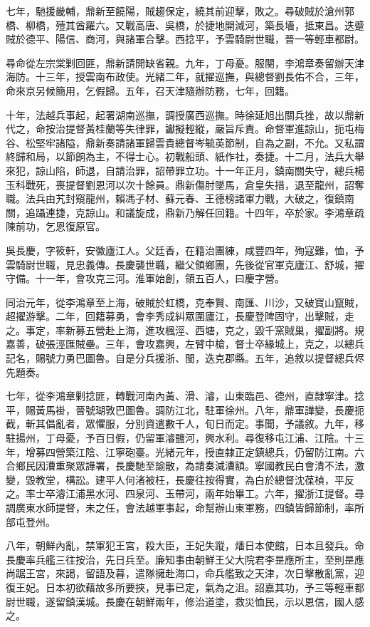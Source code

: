 \begin{pinyinscope}
七年，馳援畿輔，鼎新至饒陽，賊趨保定，繞其前迎擊，敗之。尋破賊於滄州郭橋、柳橋，殪其酋羅六。又戰高唐、吳橋，於捷地開減河，築長墻，抵東昌。迭蹙賊於德平、陽信、商河，與諸軍合擊。西捻平，予雲騎尉世職，晉一等輕車都尉。

尋命從左宗棠剿回匪，鼎新請開缺省親。九年，丁母憂。服闋，李鴻章奏留辦天津海防。十三年，授雲南布政使。光緒二年，就擢巡撫，與總督劉長佑不合，三年，命來京另候簡用，乞假歸。五年，召天津隨辦防務，七年，回籍。

十年，法越兵事起，起署湖南巡撫，調授廣西巡撫。時徐延旭出關兵挫，故以鼎新代之，命按治提督黃桂蘭等失律罪，讞擬輕縱，嚴旨斥責。命督軍進諒山，扼屯梅谷、松堅牢諸隘，鼎新奏請諸軍歸雲貴總督岑毓英節制，自為之副，不允。又私謂終歸和局，以節餉為主，不得士心。初戰船頭、紙作社，奏捷。十二月，法兵大舉來犯，諒山陷，師退，自請治罪，詔帶罪立功。十一年正月，鎮南關失守，總兵楊玉科戰死，喪提督劉恩河以次十餘員。鼎新傷肘墜馬，倉皇失措，退至龍州，詔奪職。法兵由艽封窺龍州，賴馮子材、蘇元春、王德榜諸軍力戰，大破之，復鎮南關，追躡連捷，克諒山。和議旋成，鼎新乃解任回籍。十四年，卒於家。李鴻章疏陳前功，乞恩復原官。

吳長慶，字筱軒，安徽廬江人。父廷香，在籍治團練，咸豐四年，殉寇難，恤，予雲騎尉世職，見忠義傳。長慶襲世職，繼父領鄉團，先後從官軍克廬江、舒城，擢守備。十一年，會攻克三河。淮軍始創，領五百人，曰慶字營。

同治元年，從李鴻章至上海，破賊於虹橋，克奉賢、南匯、川沙，又破寶山竄賊，超擢游擊。二年，回籍募勇，會李秀成糾眾圍廬江，長慶登陴固守，出擊賊，走之。事定，率新募五營赴上海，進攻楓涇、西塘，克之，毀千窯賊巢，擢副將。規嘉善，破張涇匯賊壘。三年，會攻嘉興，左臂中槍，督士卒緣城上，克之，以總兵記名，賜號力勇巴圖魯。自是分兵援浙、閩，迭克郡縣。五年，追敘以提督總兵侭先題奏。

七年，從李鴻章剿捻匪，轉戰河南內黃、滑、濬，山東臨邑、德州，直隸寧津。捻平，賜黃馬褂，晉號瑚敦巴圖魯。調防江北，駐軍徐州。八年，鼎軍譁變，長慶扼截，斬其倡亂者，眾懼服，分別資遣數千人，旬日而定。事聞，予議敘。九年，移駐揚州，丁母憂，予百日假，仍留軍濬鹽河，興水利。尋復移屯江浦、江陰。十三年，增募四營築江陰、江寧砲臺。光緒元年，授直隸正定鎮總兵，仍留防江南。六合鄉民因漕重聚眾譁署，長慶馳至諭散，為請奏減漕額。寧國教民白會清不法，激變，毀教堂，構訟。建平人何渚被枉，長慶往按得實，為白於總督沈葆楨，平反之。率士卒濬江浦黑水河、四泉河、玉帶河，兩年始畢工。六年，擢浙江提督。尋調廣東水師提督，未之任，會法越軍事起，命幫辦山東軍務，四鎮皆歸節制，率所部屯登州。

八年，朝鮮內亂，禁軍犯王宮，殺大臣，王妃失蹤，燔日本使館，日本且發兵。命長慶率兵艦三往按治，先日兵至。廉知事由朝鮮王父大院君李昰應所主，至則昰應尚踞王宮，來謁，留語及暮，遣隊擁赴海口，命兵艦致之天津，次日擊散亂黨，迎復王妃。日本初欲藉故多所要挾，見事已定，氣為之沮。詔嘉其功，予三等輕車都尉世職，遂留鎮漢城。長慶在朝鮮兩年，修治道塗，救災恤民，示以恩信，國人感之。


\end{pinyinscope}
